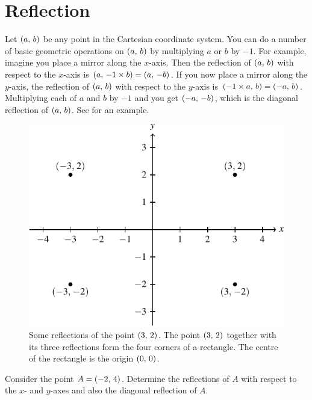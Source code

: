 \documentclass[a4paper,oneside,12pt]{article}
\begin{document}

\section{Reflection}

Let $\left\lparen{a},\, {b}\right\rparen$ be any point in the Cartesian coordinate system.
You can do a number of basic geometric operations on $\left\lparen{a},\, {b}\right\rparen$ by
multiplying $a$ or $b$ by $-1$.  For example, imagine you place a
mirror along the $x$-axis.  Then the reflection of $\left\lparen{a},\, {b}\right\rparen$ with
respect to the $x$-axis is $\left\lparen{a},\, {-1 \times b}\right\rparen = \left\lparen{a},\, {-b}\right\rparen$.
If you now place a mirror along the $y$-axis, the reflection of
$\left\lparen{a},\, {b}\right\rparen$ with respect to the $y$-axis is
$\left\lparen{-1 \times a},\, {b}\right\rparen = \left\lparen{-a},\, {b}\right\rparen$.  Multiplying each of $a$ and
$b$ by $-1$ and you get $\left\lparen{-a},\, {-b}\right\rparen$, which is the diagonal
reflection of $\left\lparen{a},\, {b}\right\rparen$.  See 
for an example.

\begin{figure}[!htbp]
\centering
\includegraphics[scale=1.1]{image/03/reflection.pdf}
\caption{%
  Some reflections of the point $\left\lparen{3},\, {2}\right\rparen$.  The point
  $\left\lparen{3},\, {2}\right\rparen$ together with its three reflections form the four
  corners of a rectangle.  The centre of the rectangle is the origin
  $\left\lparen{0},\, {0}\right\rparen$.
}
\label{fig:reflections_of_point}
\end{figure}

\begin{exercise}
Consider the point $A = \left\lparen{-2},\, {4}\right\rparen$.  Determine the reflections of
$A$ with respect to the $x$- and $y$-axes and also the diagonal
reflection of $A$.
\end{exercise}
\end{document}
